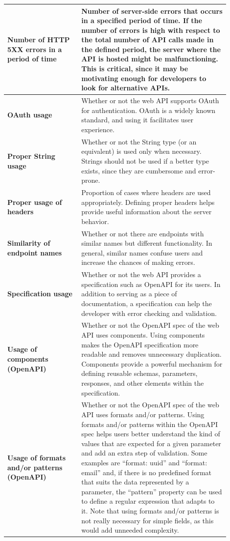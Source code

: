 \documentclass[12pt]{article}
\begin{document}
\begin{center}
{\begin{longtable}{p{0.3\linewidth}p{0.6\linewidth}}
			\hline
			\textbf{Number of HTTP 5XX errors in a period of time} & Number of server-side errors that occurs in a specified period of time. If the number of errors is high with respect to the total number of API calls made in the defined period, the server where the API is hosted might be malfunctioning. This is critical, since it may be motivating enough for developers to look for alternative APIs.\\
			\hline
			\textbf{OAuth usage} & Whether or not the web API supports OAuth for authentication. OAuth is a widely known standard, and using it facilitates user experience.\\
			\hline
			\textbf{Proper String usage} & Whether or not the String type (or an equivalent) is used only when necessary. Strings should not be used if a better type exists, since they are cumbersome and error-prone.\\
			\hline
			\textbf{Proper usage of headers} & Proportion of cases where headers are used appropriately. Defining proper headers helps provide useful information about the server behavior.\\
			\hline
			\textbf{Similarity of endpoint names} & Whether or not there are endpoints with similar names but different functionality. In general, similar names confuse users and increase the chances of making errors.\\
			\hline
			\textbf{Specification usage} & Whether or not the web API provides a specification such as OpenAPI for its users. In addition to serving as a piece of documentation, a specification can help the developer with error checking and validation.\\
			\hline
			\textbf{Usage of components (OpenAPI)} & Whether or not the OpenAPI spec of the web API uses components. Using components makes the OpenAPI specification more readable and removes unnecessary duplication. Components provide a powerful mechanism for defining reusable schemas, parameters, responses, and other elements within the specification.\\
			\hline
			\textbf{Usage of formats and/or patterns (OpenAPI)} & Whether or not the OpenAPI spec of the web API uses formats and/or patterns. Using formats and/or patterns within the OpenAPI spec helps users better understand the kind of values that are expected for a given parameter and add an extra step of validation. Some examples are ``format: uuid'' and ``format: email'' and, if there is no predefined format that suits the data represented by a parameter, the ``pattern'' property can be used to define a regular expression that adapts to it. Note that using formats and/or patterns is not really necessary for simple fields, as this would add unneeded complexity.\\

\end{longtable}}
\end{center}
\end{document}
